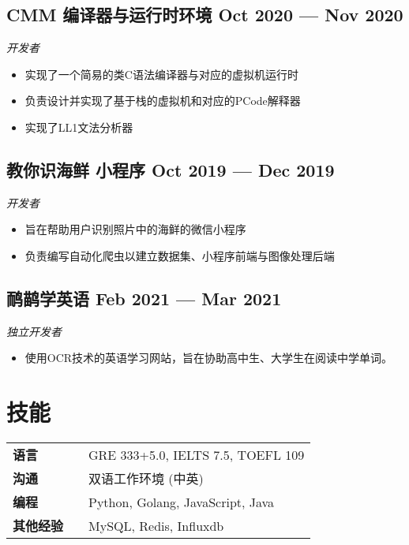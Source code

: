 \documentclass[a4,12pt]{article}
\newcommand{\subtext}[1]{
#1\par\vspace{-0.3cm}}
\newenvironment{zitemize}{
\begin{itemize}\itemsep0pt \parskip0pt \parsep1pt}
{\end{itemize}\vspace{-0.5cm}}
\newcommand{\hskills}[1]{
\textbf{\bfseries #1} }
\begin{document}
\subsection*{CMM 编译器与运行时环境 \hfill \textbf{Oct 2020 --- Nov 2020}}
\subtext{\textit{开发者}}
\begin{zitemize}
    \item 实现了一个简易的类C语法编译器与对应的虚拟机运行时 
    \item 负责设计并实现了基于栈的虚拟机和对应的PCode解释器
    \item 实现了LL1文法分析器
\end{zitemize}

\subsection*{教你识海鲜 小程序 \hfill \textbf{Oct 2019 --- Dec 2019}}
\subtext{\textit{开发者}}
\begin{zitemize}
    \item 旨在帮助用户识别照片中的海鲜的微信小程序 
    \item 负责编写自动化爬虫以建立数据集、小程序前端与图像处理后端
\end{zitemize}

\subsection*{鸸鹋学英语 \hfill \textbf{Feb 2021 --- Mar 2021}}
\subtext{\textit{独立开发者}}
\begin{zitemize}
    \item 使用OCR技术的英语学习网站，旨在协助高中生、大学生在阅读中学单词。
\end{zitemize}


\section{\textbf{技能}}
\begin{tabular}{p{11em} p{1em} p{43em}}
\hskills{语言} & & GRE 333+5.0, IELTS 7.5, TOEFL 109 \\
\hskills{沟通} & & 双语工作环境 (中英)  \\
\hskills{编程} &  & Python, Golang, JavaScript, Java \\
\hskills{其他经验} & & MySQL, Redis, Influxdb
\end{tabular}
\vspace{-0.2cm}
\end{document}
